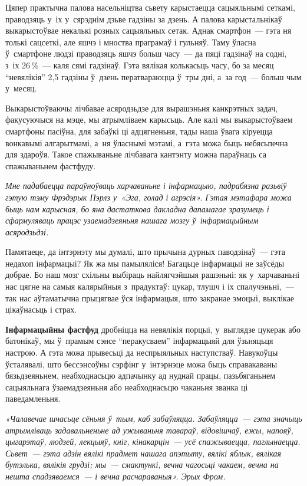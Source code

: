 Цяпер практычна палова насельніцтва сьвету карыстаецца сацыяльнымі сеткамі, праводзяць у~іх у~сярэднім дзьве гадзіны за дзень. А палова карыстальнікаў выкарыстоўвае некалькі розных сацыяльных сетак. Аднак смартфон~--- гэта ня толькі сацсеткі, але яшчэ і мноства праграмаў і гульняў. Таму ўласна ў~смартфоне людзі праводзяць яшчэ больш часу~--- да пяці гадзінаў на содні, з~іх 26\,\%~--- каля сямі гадзінаў. Гэта вялікая колькасьць часу, бо за месяц ``невялікія'' 2,5 гадзіны ў~дзень ператвараюцца ў~тры дні, а~за год~--- больш чым у~месяц.

Выкарыстоўваючы лічбавае асяродзьдзе для вырашэньня канкрэтных задач, факусуючыся на мэце, мы атрымліваем карысьць. Але калі мы выкарыстоўваем смартфоны пасіўна, для забаўкі ці адцягненьня, тады наша ўвага кіруецца вонкавымі алгарытмамі, а~ня ўласнымі мэтамі, а~гэта можа быць небясьпечна для здароўя. Такое спажываньне лічбавага кантэнту можна параўнаць са спажываньнем фастфуду.

\emph{Мне падабаецца параўноўваць харчаваньне і інфармацыю, падрабязна разьвіў гэтую тэму Фрэдэрык Пэрлз у~«Эга, голад і агрэсія». Гэтая мэтафара можа быць нам карысная, бо яна дастаткова дакладна дапамагае зразумець і сфармуляваць працэс узаемадзеяньня нашага мозгу ў~інфармацыйным асяродзьдзі.} 

Памятаеце, да інтэрнэту мы думалі, што прычына дурных паводзінаў~--- гэта недахоп інфармацыі? Як жа мы памыляліся! Багацьце інфармацыі не заўсёды добрае. Бо наш мозг схільны выбіраць найлягчэйшыя рашэньні: як у~харчаваньні нас цягне на самыя калярыйныя з~прадуктаў: цукар, тлушч і іх спалучэньні,~--- так нас аўтаматычна прыцягвае ўся інфармацыя, што закранае эмоцыі, выклікае цікаўнасьць і страх.

\textbf{Інфармацыйны фастфуд} дробніцца на невялікія порцыі, у~выглядзе цукерак або батонікаў, мы ў~прамым сэнсе ``перакусваем'' інфармацыяй для ўзьняцьця настрою. А гэта можа прывесьці да неспрыяльных наступстваў. Навукоўцы ўсталявалі, што бессэнсоўны сэрфінг у~інтэрнэце можа быць справакаваны бязьдзеяньнем, неабходнасьцю адпачынку ад нуднай працы, пазьбяганьнем сацыяльнага ўзаемадзеяньня або неабходнасьцю чаканьня званка ці паведамленьня.

\emph{«Чалавечае шчасьце сёньня ў~тым, каб забаўляцца. Забаўляцца~--- гэта значыць атрымліваць задавальненьне ад ужываньня тавараў, відовішчаў, ежы, напояў, цыгарэтаў, людзей, лекцыяў, кніг, кінакарцін~--- усё спажываецца, паглынаецца. Сьвет~--- гэта адзін вялікі прадмет нашага апэтыту, вялікі яблык, вялікая бутэлька, вялікія грудзі; мы~--- смактункі, вечна чагосьці чакаем, вечна на нешта спадзяваемся~--- і вечна расчараваныя». Эрых Фром.} 

